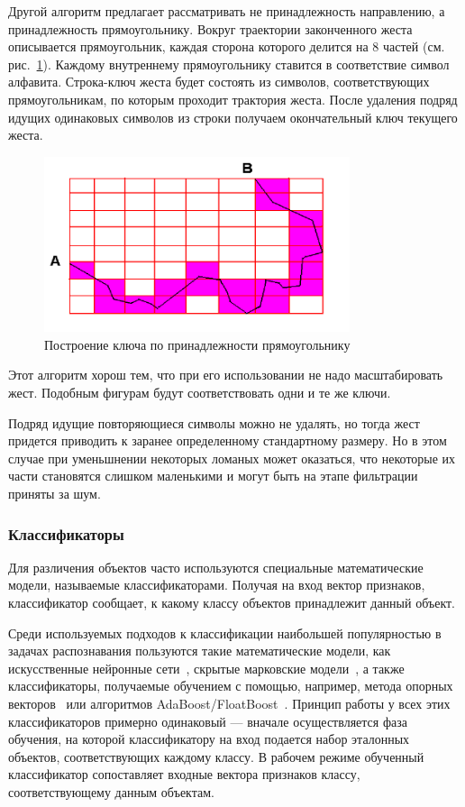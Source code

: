 \documentclass[a5paper]{article}
\begin{document}
Другой алгоритм предлагает рассматривать не принадлежность направлению, а принадлежность прямоугольнику. Вокруг траектории законченного жеста 
описывается прямоугольник, каждая сторона которого делится на 8 частей (см. рис.~\ref{squares}). Каждому внутреннему 
прямоугольнику ставится в соответствие символ алфавита. Строка-ключ жеста будет состоять из символов, соответствующих прямоугольникам, по
которым проходит трактория жеста. После удаления подряд идущих одинаковых символов из строки получаем окончательный ключ текущего жеста. 

\begin{figure} [ht]
  \begin{center}
    \includegraphics[width=0.8\textwidth, bb=0 0 544 390]{03-squares.png}
    \caption{Построение ключа по принадлежности прямоугольнику}
    \label{squares}
  \end{center}
\end{figure}

Этот алгоритм хорош тем, что при его использовании не надо масштабировать жест. Подобным фигурам будут соответствовать одни и те же ключи.

Подряд идущие повторяющиеся символы можно не удалять, но тогда жест придется приводить к заранее определенному стандартному размеру. 
Но в этом случае при уменьшнении некоторых ломаных может оказаться, что некоторые их части становятся слишком маленькими и
могут быть на этапе фильтрации приняты за шум.

\subsubsection{Классификаторы}
Для различения объектов часто используются специальные математические модели, называемые классификаторами. Получая на вход вектор признаков, классификатор сообщает, к какому классу объектов принадлежит данный объект. 

Среди используемых подходов к классификации наибольшей популярностью в задачах распознавания пользуются 
такие математические модели, как искусственные нейронные сети~\cite{neuronet1, neuronet2, neuronet3}, 
скрытые марковские модели~\cite{hmm1, hmm2, hmm3}, а также классификаторы, получаемые обучением с помощью, например, 
метода опорных векторов~\cite{svm1, svm2} или алгоритмов AdaBoost/FloatBoost~\cite{boosting1, boosting2}.
Принцип работы у всех этих классификаторов примерно одинаковый --- вначале осуществляется фаза обучения, на которой классификатору на вход
подается набор эталонных объектов, соответствующих каждому классу. В рабочем режиме обученный классификатор сопоставляет входные вектора 
признаков классу, соответствующему данным объектам.
\end{document}
